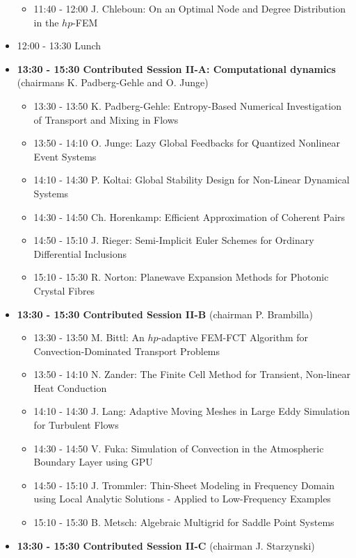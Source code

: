 \documentclass[10pt, A4]{article}%
\begin{document}
\begin{itemize}
\begin{itemize}
    \item 11:40 - 12:00 J. Chleboun: On an Optimal Node and Degree Distribution in the $hp$-FEM
  \end{itemize}
  \item 12:00 - 13:30 Lunch
  \item {\bf 13:30 - 15:30 Contributed Session II-A: Computational dynamics} (chairmans K. Padberg-Gehle and O. Junge) 
  \begin{itemize}
    \item 13:30 - 13:50 K. Padberg-Gehle: Entropy-Based Numerical Investigation of Transport and Mixing in Flows
    \item 13:50 - 14:10 O. Junge: Lazy Global Feedbacks for Quantized Nonlinear Event Systems
    \item 14:10 - 14:30 P. Koltai: Global Stability Design for Non-Linear Dynamical Systems
    \item 14:30 - 14:50 Ch. Horenkamp: Efficient Approximation of Coherent Pairs
    \item 14:50 - 15:10 J. Rieger: Semi-Implicit Euler Schemes for Ordinary Differential Inclusions
    \item 15:10 - 15:30 R. Norton: Planewave Expansion Methods for Photonic Crystal Fibres
  \end{itemize}
  \item {\bf 13:30 - 15:30 Contributed Session II-B} (chairman P. Brambilla) 
  \begin{itemize}
    \item 13:30 - 13:50 M. Bittl: An $hp$-adaptive FEM-FCT Algorithm for Convection-Dominated Transport Problems
    \item 13:50 - 14:10 N. Zander: The Finite Cell Method for Transient, Non-linear Heat Conduction
    \item 14:10 - 14:30 J. Lang: Adaptive Moving Meshes in Large Eddy Simulation for Turbulent Flows
    \item 14:30 - 14:50 V. Fuka: Simulation of Convection in the Atmospheric Boundary Layer using GPU
    \item 14:50 - 15:10 J. Trommler: Thin-Sheet Modeling in Frequency Domain using Local Analytic Solutions - Applied to Low-Frequency Examples
    \item 15:10 - 15:30 B. Metsch: Algebraic Multigrid for Saddle Point Systems
  \end{itemize}
\newpage
    \item {\bf 13:30 - 15:30 Contributed Session II-C} (chairman J. Starzynski) 
  \begin{itemize}

\end{itemize}
\end{itemize}
\end{document}
